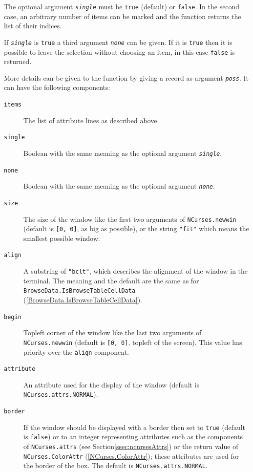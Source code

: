 \documentclass[a4paper,11pt]{report}
\begin{document}
{{{ The optional argument \mbox{\texttt{\mdseries\slshape single}} must be \texttt{true} (default) or \texttt{false}. In the second case, an arbitrary number of items can be marked and the
function returns the list of their indices. 

 If \mbox{\texttt{\mdseries\slshape single}} is \texttt{true} a third argument \mbox{\texttt{\mdseries\slshape none}} can be given. If it is \texttt{true} then it is possible to leave the selection without choosing an item, in this
case \texttt{false} is returned. 

 More details can be given to the function by giving a record as argument \mbox{\texttt{\mdseries\slshape poss}}. It can have the following components: 
\begin{description}
\item[{\texttt{items}}] The list of attribute lines as described above.
\item[{\texttt{single}}] Boolean with the same meaning as the optional argument \mbox{\texttt{\mdseries\slshape single}}.
\item[{\texttt{none}}] Boolean with the same meaning as the optional argument \mbox{\texttt{\mdseries\slshape none}}.
\item[{\texttt{size}}] The size of the window like the first two arguments of \texttt{NCurses.newwin} (default is \texttt{[0, 0]}, as big as possible), or the string \texttt{"fit"} which means the smallest possible window. 
\item[{\texttt{align}}]  A substring of \texttt{"bclt"}, which describes the alignment of the window in the terminal. The meaning and
the default are the same as for \texttt{BrowseData.IsBrowseTableCellData} (\ref{BrowseData.IsBrowseTableCellData}). 
\item[{\texttt{begin}}] Top\texttt{}left corner of the window like the last two arguments
of \texttt{NCurses.newwin} (default is \texttt{[0, 0]}, top\texttt{}left of the screen). This value has priority over the \texttt{align} component. 
\item[{\texttt{attribute}}] An attribute used for the display of the window (default is \texttt{NCurses.attrs.NORMAL}).
\item[{\texttt{border}}]  If the window should be displayed with a border then set to \texttt{true} (default is \texttt{false}) or to an integer representing attributes such as the components of \texttt{NCurses.attrs} (see Section{\nobreakspace}\ref{ssec:ncursesAttrs}) or the return value of \texttt{NCurses.ColorAttr} (\ref{NCurses.ColorAttr}); these attributes are used for the border of the box. The default is \texttt{NCurses.attrs.NORMAL}. 

\end{description}}}}
\end{document}
